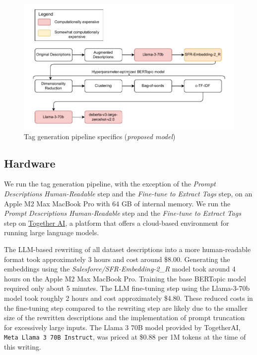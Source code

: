 \begin{figure}[h]
    \centering
    \includegraphics[width=\textwidth]{figures/tag_generation_pipeline_specifics.pdf}
    \caption{Tag generation pipeline specifics (\textit{proposed model})}
    \label{fig:tag_generation_pipeline_specifics}
\end{figure}

\subsection{Hardware}
We run the tag generation pipeline, with the exception of the \textit{Prompt Descriptions Human-Readable} step and the \textit{Fine-tune to Extract Tags} step, on an Apple M2 Max MacBook Pro with 64 GB of internal memory. We run the \textit{Prompt Descriptions Human-Readable} step and the \textit{Fine-tune to Extract Tags} step on \href{https://docs.together.ai/docs/introduction}{Together AI}, a platform that offers a cloud-based environment for running large language models.

The LLM-based rewriting of all dataset descriptions into a more human-readable format took approximately 3 hours and cost around \$8.00. Generating the embeddings using the \textit{Salesforce/SFR-Embedding-2\_R} \cite{noauthor_salesforcesfr-embedding-2_r_2024} model took around 4 hours on the Apple M2 Max MacBook Pro. Training the base BERTopic model required only about 5 minutes. The LLM fine-tuning step using the Llama-3-70b model took roughly 2 hours and cost approximately \$4.80. These reduced costs in the fine-tuning step compared to the rewriting step are likely due to the smaller size of the rewritten descriptions and the implementation of prompt truncation for excessively large inputs. The Llama 3 70B model provided by TogetherAI, \texttt{Meta Llama 3 70B Instruct}, was priced at \$0.88 per 1M tokens at the time of this writing.

